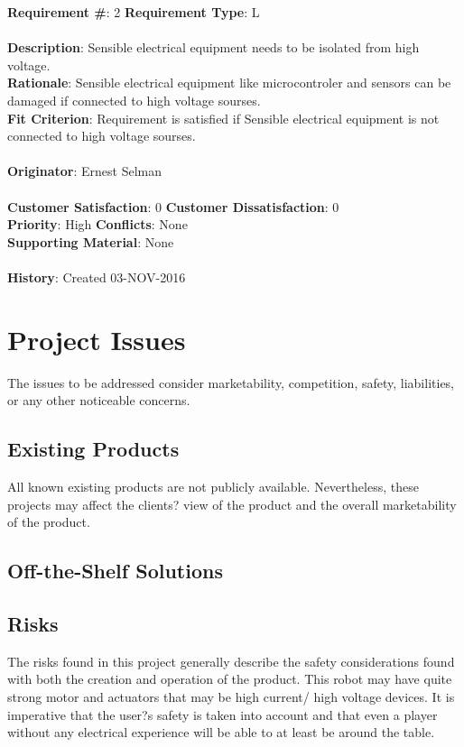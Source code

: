 \documentclass[titlepage]{article}
\begin{document}
\begin{framed}
	\noindent\textbf{Requirement \#}: 2 \hfill \textbf{Requirement Type}: L \hfill\\\\
	\noindent\textbf{Description}: Sensible electrical equipment needs to be isolated from high voltage.\\
	\textbf{Rationale}: Sensible electrical equipment like microcontroler and sensors can be damaged if connected to high voltage sourses.\\
	\textbf{Fit Criterion}: Requirement is satisfied if Sensible electrical equipment is not connected to high voltage sourses. \\\\
	\textbf{Originator}: Ernest Selman\\\\
	\noindent\textbf{Customer Satisfaction}: 0 \hfill 	\textbf{Customer Dissatisfaction}: 0 \hfill\\
	\textbf{Priority}: High \hfill \textbf{Conflicts}: None \hfill\\
	\textbf{Supporting Material}: None\\\\
	\noindent\textbf{History}: Created 03-NOV-2016
\end{framed}



\section{Project Issues}
The issues to be addressed consider marketability, competition, safety, liabilities, or any other noticeable
concerns.
\subsection{Existing Products}
All known existing products are not publicly available. Nevertheless, these projects may affect the clients? view of the product and the overall marketability of the product.

\subsection{Off-the-Shelf Solutions}

\subsection{Risks}
The risks found in this project generally describe the safety considerations found with both the creation and operation of the product. This robot may have quite strong motor and actuators that may be high current/ high voltage devices. It is imperative that the user?s safety is taken into account and that even a player without any electrical experience will be able to at least be around the table.
\end{document}
